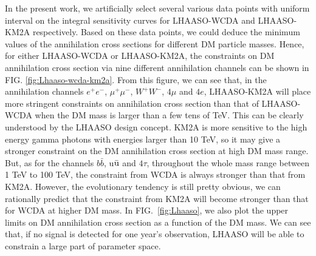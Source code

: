 \documentclass[12pt,prd,showpacs,amsmath,amssymb,aps,floats,floatfix,nofootinbib]{revtex4-1}
\begin{document}
In the present work, we artificially select several various data points with uniform interval on the integral sensitivity curves for LHAASO-WCDA and LHAASO-KM2A respectively. Based on these data points, we could deduce the minimum values of the annihilation cross sections for different DM particle masses. Hence, for either LHAASO-WCDA or LHAASO-KM2A, the constraints on DM annihilation cross section via nine different annihilation channels can be shown in FIG. \ref{fig:Lhaaso-wcda-km2a}. From this figure, we can see that, in the annihilation channels $e^{+}e^{-}$, $\mu^{+}\mu^{-}$, $W^+W^-$, $4\mu$ and $4e$, LHAASO-KM2A will place more stringent constraints on annihilation cross section than that of LHAASO-WCDA when the DM mass is larger than a few tens of TeV. This can be clearly understood by the LHAASO design concept. KM2A is more sensitive to the high energy gamma photons with energies larger than 10 TeV, so it may give a stronger constraint on the DM annihilation cross section at high DM mass range. But, as for the channels $b\bar{b}$, u$\bar{\rm u}$ and $4\tau$, throughout the whole mass range between 1 TeV to 100 TeV, the constraint from WCDA is always stronger than that from KM2A. However, the evolutionary tendency is still pretty obvious, we can rationally predict that the constraint from KM2A will become stronger than that for WCDA at higher DM mass.
In FIG.~\ref{fig:Lhaaso}, we also plot the upper limits on DM annihilation cross section as a function of the DM mass. We can see that, if no signal is detected for one year's observation, LHAASO  will be able to constrain a large part of parameter space.
\end{document}
